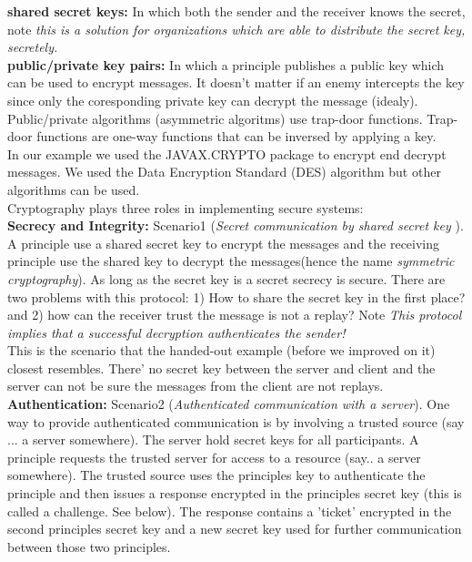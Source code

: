  \textbf{shared secret keys:} In which both the sender and the receiver knows the secret, note \textit{this is a solution for organizations which are able to distribute the secret key, secretely.}\\

\textbf{public/private key pairs:} In which a principle publishes a public key which can be used to encrypt messages. It doesn't matter if an enemy intercepts the key since only the coresponding private key can decrypt the message (idealy). Public/private algorithms (asymmetric algoritms) use trap-door functions. Trap-door functions are one-way functions that can be inversed by applying a key.  \\


In our example we used the JAVAX.CRYPTO package to encrypt end decrypt messages. We used the Data Encryption Standard (DES) algorithm but other algorithms can be used.\\

Cryptography plays three roles in implementing secure systems:\\

\textbf{Secrecy and Integrity:} Scenario1 (\textit{Secret communication by shared secret key }). A principle use a shared secret key to encrypt the messages and the receiving principle use the shared key to decrypt the messages(hence the name \textit{symmetric cryptography}). As long as the secret key is a secret secrecy is secure. There are two problems with this protocol: 1) How to share the secret key in the first place? and 2) how can the receiver trust the message is not a replay? Note \textit{This protocol implies that a successful decryption authenticates the sender!} \\

This is the scenario that the handed-out example (before we improved on it) closest resembles. There' no secret key between the server and client and the server can not be sure the messages from the client are not replays. \\

\textbf{Authentication:} Scenario2 (\textit{Authenticated communication with a server}). One way to provide authenticated communication is by involving a trusted source (say ... a server somewhere). The server hold secret keys for all participants. A principle requests the trusted server for access to a resource (say.. a server somewhere). The trusted source uses the principles key to authenticate the principle and then issues a response encrypted in the principles secret key (this is called a challenge. See below). The response contains a 'ticket' encrypted in the second principles secret key and a new secret key used for further communication between those two principles. \\ 

